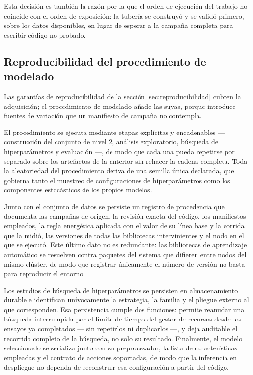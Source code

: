 \documentclass[12pt,oneside,spanish]{book}
\begin{document}
Esta decisión es también la razón por la que el orden de ejecución del trabajo no coincide con el orden de exposición: la tubería se construyó y se validó primero, sobre los datos disponibles, en lugar de esperar a la campaña completa para escribir código no probado.

\subsection{Reproducibilidad del procedimiento de modelado}
\label{sec:fase2-reproducibilidad}

Las garantías de reproducibilidad de la sección \ref{sec:reproducibilidad} cubren la adquisición; el procedimiento de modelado añade las suyas, porque introduce fuentes de variación que un manifiesto de campaña no contempla.

El procedimiento se ejecuta mediante etapas explícitas y encadenables --- construcción del conjunto de nivel 2, análisis exploratorio, búsqueda de hiperparámetros y evaluación ---, de modo que cada una pueda repetirse por separado sobre los artefactos de la anterior sin rehacer la cadena completa. Toda la aleatoriedad del procedimiento deriva de una semilla única declarada, que gobierna tanto el muestreo de configuraciones de hiperparámetros como los componentes estocásticos de los propios modelos.

Junto con el conjunto de datos se persiste un registro de procedencia que documenta las campañas de origen, la revisión exacta del código, los manifiestos empleados, la regla energética aplicada con el valor de su línea base y la corrida que la midió, las versiones de todas las bibliotecas intervinientes y el nodo en el que se ejecutó. Este último dato no es redundante: las bibliotecas de aprendizaje automático se resuelven contra paquetes del sistema que difieren entre nodos del mismo clúster, de modo que registrar únicamente el número de versión no basta para reproducir el entorno.

Los estudios de búsqueda de hiperparámetros se persisten en almacenamiento durable e identifican unívocamente la estrategia, la familia y el pliegue externo al que corresponden. Esa persistencia cumple dos funciones: permite reanudar una búsqueda interrumpida por el límite de tiempo del gestor de recursos desde los ensayos ya completados --- sin repetirlos ni duplicarlos ---, y deja auditable el recorrido completo de la búsqueda, no solo su resultado. Finalmente, el modelo seleccionado se serializa junto con su preprocesador, la lista de características empleadas y el contrato de acciones soportadas, de modo que la inferencia en despliegue no dependa de reconstruir esa configuración a partir del código.
\end{document}
